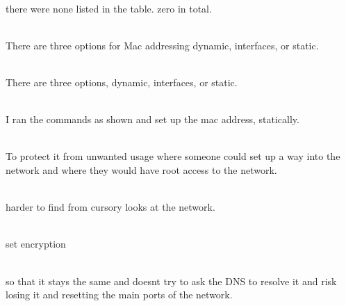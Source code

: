\documentclass[../EngineeringJournal_CDavis.tex]{subfiles}
\begin{document}
\clearpage



\\there were none listed in the table. zero in total. 
\hfill\break

\noindent{}
\\There are three options for Mac addressing dynamic, interfaces, or static.
\hfill\break

\noindent{}
\\There are three options, dynamic, interfaces, or static.
\hfill\break

\noindent{}
\\I ran the commands as shown and set up the mac address, statically.
\hfill\break


\\To protect it from unwanted usage where someone could set up a way into the
network and where they would have root access to the network.
\hfill\break

\noindent{}
\\harder to find from cursory looks at the network.
\hfill\break

\noindent{}
\\set encryption
\hfill\break

\noindent{}
\\so that it stays the same and doesnt try to ask the DNS to resolve it and
risk losing it and resetting the main ports of the network.


\end{document}

